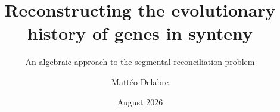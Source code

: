 \documentclass{manuscrit}
\title{Reconstructing the evolutionary history of genes in synteny}
\subtitle{An algebraic approach to the segmental reconciliation problem}
\author{Mattéo Delabre}
\date{August 2026}
\begin{document}
\maketitle
\makejury














\end{document}
